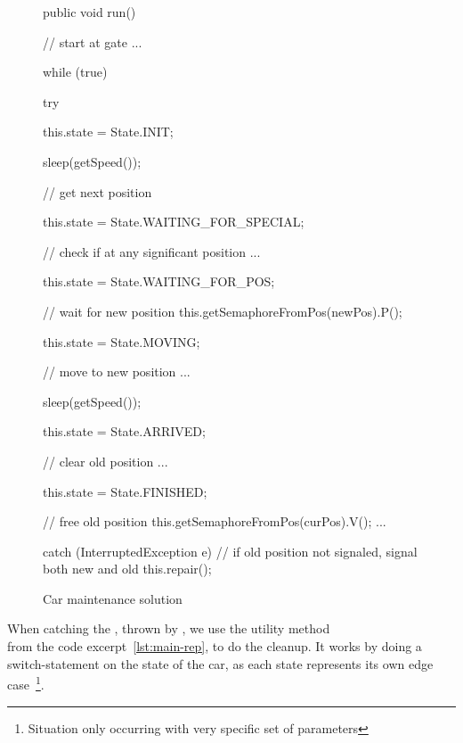 \begin{figure}[H]
  \begin{java}
public void run() {
    // start at gate
    ...

    while (true) {
        try {
            this.state = State.INIT;

            sleep(getSpeed());

            // get next position

            this.state = State.WAITING_FOR_SPECIAL;

            // check if at any significant position
            ...

            this.state = State.WAITING_FOR_POS;

            // wait for new position
            this.getSemaphoreFromPos(newPos).P();

            this.state = State.MOVING;

            // move to new position
            ...

            sleep(getSpeed());

            this.state = State.ARRIVED;

            // clear old position
            ...

            this.state = State.FINISHED;

            // free old position
            this.getSemaphoreFromPos(curPos).V();
            ...

        } catch (InterruptedException e) {
            // if old position not signaled, signal both new and old
            this.repair();
        }
    }
}
  \end{java}
  \caption{Car maintenance solution}
\label{lst:main-run}
\end{figure}

When catching the , thrown by
, we use the utility method \\
 from the code excerpt~\ref{lst:main-rep}, to do the
cleanup. It works by doing a switch-statement on the state of the car,
as each state represents its own edge case~\footnote{Situation only
  occurring with very specific set of parameters}.

